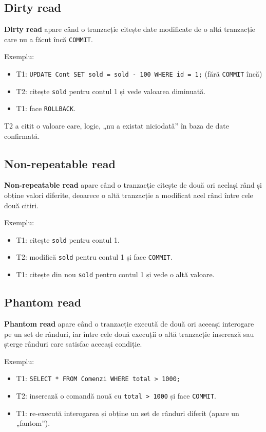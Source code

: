 \documentclass[11pt,a4paper]{article}
\begin{document}
\subsection{Dirty read}

\textbf{Dirty read} apare când o tranzacție citește date modificate de o altă tranzacție care nu a făcut încă \texttt{COMMIT}.

Exemplu:
\begin{itemize}[leftmargin=1.5cm]
  \item T1: \texttt{UPDATE Cont SET sold = sold - 100 WHERE id = 1;} (fără \texttt{COMMIT} încă)
  \item T2: citește \texttt{sold} pentru contul 1 și vede valoarea diminuată.
  \item T1: face \texttt{ROLLBACK}.
\end{itemize}
T2 a citit o valoare care, logic, „nu a existat niciodată” în baza de date confirmată.

\subsection{Non-repeatable read}

\textbf{Non-repeatable read} apare când o tranzacție citește de două ori același rând și obține valori diferite, deoarece o altă tranzacție a modificat acel rând între cele două citiri.

Exemplu:
\begin{itemize}[leftmargin=1.5cm]
  \item T1: citește \texttt{sold} pentru contul 1.
  \item T2: modifică \texttt{sold} pentru contul 1 și face \texttt{COMMIT}.
  \item T1: citește din nou \texttt{sold} pentru contul 1 și vede o altă valoare.
\end{itemize}

\subsection{Phantom read}

\textbf{Phantom read} apare când o tranzacție execută de două ori aceeași interogare pe un set de rânduri, iar între cele două execuții o altă tranzacție inserează sau șterge rânduri care satisfac aceeași condiție.

Exemplu:
\begin{itemize}[leftmargin=1.5cm]
  \item T1: \texttt{SELECT * FROM Comenzi WHERE total > 1000;}
  \item T2: inserează o comandă nouă cu \texttt{total > 1000} și face \texttt{COMMIT}.
  \item T1: re-execută interogarea și obține un set de rânduri diferit (apare un „fantom”).
\end{itemize}
\end{document}
